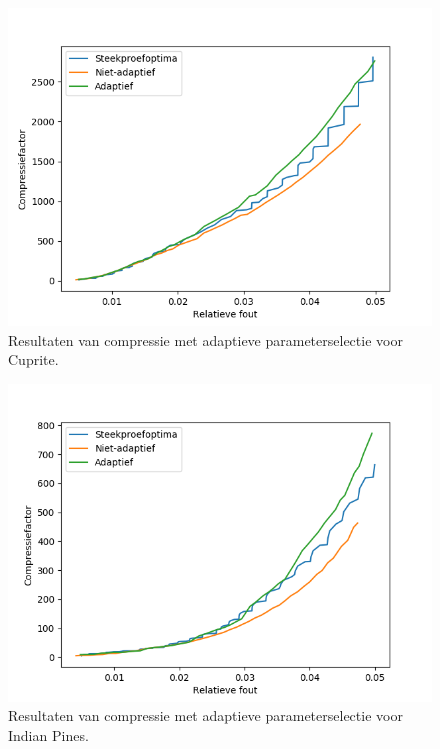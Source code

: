 \newpage
\begin{figure}[H]
  \centering
  \includegraphics[scale=0.7]{images/parameter_functions_results_including_adaptive_Cuprite.png}
  \caption{Resultaten van compressie met adaptieve parameterselectie voor Cuprite.}
  \label{fig:parameter_functions_results_including_adaptive_Cuprite}
\end{figure}

\begin{figure}[H]
  \centering
  \includegraphics[scale=0.7]{images/parameter_functions_results_including_adaptive_Indian_Pines.png}
  \caption{Resultaten van compressie met adaptieve parameterselectie voor Indian Pines.}
  \label{fig:parameter_functions_results_including_adaptive_Indian_Pines}
\end{figure}

